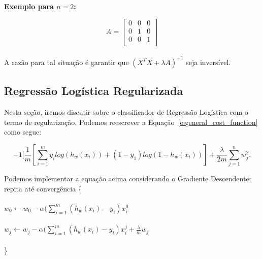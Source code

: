 \textbf{Exemplo para $n = 2$:}

\[A=
  \begin{bmatrix}
    0 & 0 & 0 \\
    0 & 1 & 0 \\
    0 & 0 & 1 \\
  \end{bmatrix}\] \\
  
A razão para tal situação é garantir que $(X^TX + \lambda A)^{-1}$ seja inversível.

\subsection{Regressão Logística Regularizada}
\label{ss.logistic_regression_reg}

Nesta seção, iremos discutir sobre o classificador de Regressão Logística com o termo de regularização. Podemos reescrever a Equação~\ref{e.general_cost_function} como segue:

\begin{equation}
\label{e.log_regression_new}
-1[\frac{1}{m} [\sum\limits_{i=1}^m y_i log(h_w(x_i)) + (1 - y_1) log(1 - h_w(x_i))]	 + \frac{\lambda}{2m} \sum\limits_{j=1}^n w_j^2.
\end{equation}

Podemos implementar a equação acima considerando o Gradiente Descendente:\\

repita até convergência \{ \\ \\
 \hspace*{25pt} $w_0 \leftarrow w_0 - \alpha(\sum\limits_{i=1}^m(h_w(x_i) - y_i)x_i^0$ \\ \\
 \hspace*{25pt} $w_j \leftarrow w_j - \alpha(\sum\limits_{i=1}^m(h_w(x_i) - y_i)x_i^j + \frac{\lambda}{m}w_j$ \\ \\
 \hspace*{15pt} \}
 
